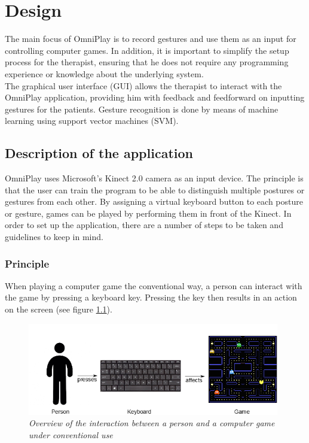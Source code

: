 \chapter{Design}
\label{chapter: design}

The main focus of OmniPlay is to record gestures and use them as an input for controlling computer games. In addition, it is important to simplify the setup process for the therapist, ensuring that he does not require any programming experience or knowledge about the underlying system.\\

The graphical user interface (GUI) allows the therapist to interact with the OmniPlay application, providing him with feedback and feedforward on inputting gestures for the patients. Gesture recognition is done by means of machine learning using support vector machines (SVM).


\section{Description of the application}

OmniPlay uses Microsoft's Kinect 2.0 camera as an input device. The principle is that the user can train the program to be able to distinguish multiple postures or gestures from each other. By assigning a virtual keyboard button to each posture or gesture, games can be played by performing them in front of the Kinect. In order to set up the application, there are a number of steps to be taken and guidelines to keep in mind.


\subsection{Principle}

When playing a computer game the conventional way, a person can interact with the game by pressing a keyboard key. Pressing the key then results in an action on the screen (see figure \ref{fig: overview_basic_interaction}).\\

\begin{figure}[H]
\begin{center}
\includegraphics[width=11cm]{Concept1.png}
\caption{\emph{Overview of the interaction between a person and a computer game under conventional use}}
\label{fig: overview_basic_interaction}
\end{center}
\end{figure}

